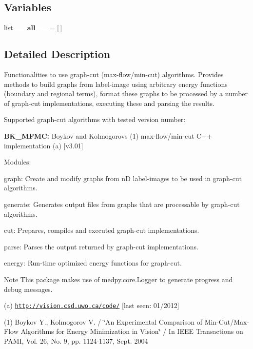 \subsection*{Variables}
\begin{DoxyCompactItemize}
\item 
\hypertarget{namespacemedpy_1_1graphcut_aad412f9af7e17894cc03632be5905a54}{
list {\bfseries \_\-\_\-all\_\-\_\-} = \mbox{[}$\,$\mbox{]}}
\label{namespacemedpy_1_1graphcut_aad412f9af7e17894cc03632be5905a54}

\end{DoxyCompactItemize}


\subsection{Detailed Description}
Functionalities to use graph-\/cut (max-\/flow/min-\/cut) algorithms. Provides methods to build graphs from label-\/image using arbitrary energy functions (boundary and regional terms), format these graphs to be processed by a number of graph-\/cut implementations, executing these and parsing the results.

Supported graph-\/cut algorithms with tested version number:\par

\begin{DoxyItemize}
\item {\bfseries BK\_\-MFMC:} Boykov and Kolmogorovs (1) max-\/flow/min-\/cut C++ implementation (a) \mbox{[}v3.01\mbox{]}
\end{DoxyItemize}

Modules:
\begin{DoxyItemize}
\item graph: Create and modify graphs from nD label-\/images to be used in graph-\/cut algorithms.
\item generate: Generates output files from graphs that are processable by graph-\/cut algorithms.
\item cut: Prepares, compiles and executed graph-\/cut implementations.
\item parse: Parses the output returned by graph-\/cut implementations.
\item energy: Run-\/time optimized energy functions for graph-\/cut.
\end{DoxyItemize}

\begin{DoxyNote}{Note}
This package makes use of  medpy.core.Logger to generate progress and debug messages.
\end{DoxyNote}
(a) \href{http://vision.csd.uwo.ca/code/}{\tt http://vision.csd.uwo.ca/code/} \mbox{[}last seen: 01/2012\mbox{]}

(1) Boykov Y., Kolmogorov V. / \char`\"{}An Experimental Comparison of Min-\/Cut/Max-\/Flow
 Algorithms for Energy Minimization in Vision\char`\"{} / In IEEE Transactions on PAMI, Vol. 26, No. 9, pp. 1124-\/1137, Sept. 2004 